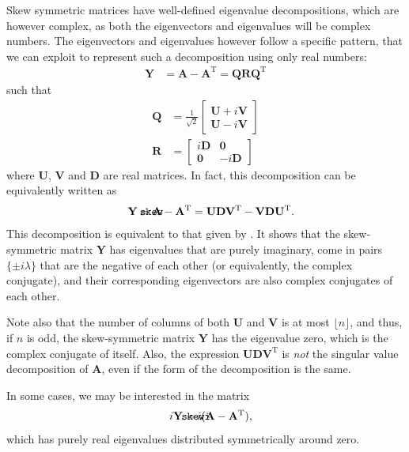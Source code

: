 \documentclass{article}
\def\mathnote#1{%
  \tag*{\rlap{\hspace\marginparsep\smash{\parbox[t]{\marginparwidth}{#1}}}}
}
\begin{document}
Skew symmetric matrices have well-defined eigenvalue decompositions,
which are however complex, as both the eigenvectors and eigenvalues will
be complex numbers.  The eigenvectors and eigenvalues however follow a
specific pattern, that we can exploit to represent such a decomposition
using only real numbers:
\begin{align}
  \mathbf Y &= \mathbf A - \mathbf A^{\mathrm T} = \mathbf Q \mathbf R \mathbf Q^{\mathrm T}
\end{align}
such that
\begin{align}
  \mathbf Q &= \frac 1 {\sqrt{2}} \left[
    \begin{array}{cc}
      \mathbf U + i \mathbf V \\
      \mathbf U - i \mathbf V 
    \end{array}
    \right] \\
  \mathbf R &= \left[ \begin{array}{cc}
      i \mathbf D & \mathbf 0 \\
      \mathbf 0 & -i \mathbf D
    \end{array} \right]
\end{align}
where $\mathbf U$, $\mathbf V$ and $\mathbf D$ are real matrices.  In
fact, this decomposition can be equivalently written as
\begin{align}
  \mathnote{\texttt{skew}}
  \mathbf Y = \mathbf A - \mathbf A^{\mathrm T} &=
  \mathbf U \mathbf D \mathbf V^{\mathrm T} - \mathbf V \mathbf D \mathbf U^{\mathrm T}.
\end{align}
This decomposition is equivalent to that given by 
\cite{b869}.  It shows that the skew-symmetric matrix $\mathbf Y$ has
eigenvalues that are purely imaginary, come  
in pairs $\{\pm i \lambda\}$ that are the negative of each other (or
equivalently, the complex conjugate), and their corresponding
eigenvectors are also complex conjugates of each other.

Note also that the number of columns of both $\mathbf U$ and $\mathbf V$
is at most $\lfloor n \rfloor$, and thus, if $n$ is odd, the
skew-symmetric matrix $\mathbf Y$ has the
eigenvalue zero, which is the complex conjugate of itself.  Also, the
expression $\mathbf U \mathbf D \mathbf V^{\mathrm T}$ is \emph{not} the
singular value decomposition of $\mathbf A$, even if the form of the
decomposition is the same. 

In some cases, we may be interested in the matrix
\begin{align}
  \mathnote{\texttt{skewi}}
  i \mathbf Y &= i ( \mathbf A - \mathbf A^{\mathrm T} ),
\end{align}
which has purely real eigenvalues distributed symmetrically around
zero. 
\end{document}
